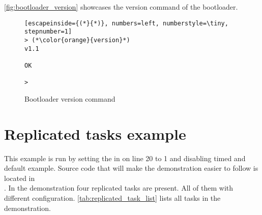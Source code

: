 \autoref{fig:bootloader_version} showcases the version command of the bootloader.

\begin{figure}[H]
\begin{changemargin}{1cm}{1cm}
\begin{lstlisting}[escapeinside={(*}{*)}, numbers=left, numberstyle=\tiny, stepnumber=1]
> (*\color{orange}{version}*)
v1.1

OK

>  
\end{lstlisting}  
\end{changemargin}
\caption{Bootloader version command}
\label{fig:bootloader_version}
\end{figure}

\section{Replicated tasks example}

This example is run by setting the  in  on line 20 to 1 and disabling timed and default example. Source code that will make the demonstration easier to follow is located in \\. In the demonstration four replicated tasks are present. All of them with different configuration. \autoref{tab:replicated_task_list} lists all tasks in the demonstration.

\begin{table}[H]
\centering
\caption{All replicated tasks in demonstration}
\label{tab:replicated_task_list}
\end{table}

